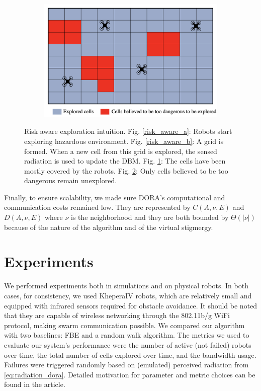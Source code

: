 \begin{figure}[htbp]
\begin{subfigure}{0.45\textwidth}
         \caption{}
         \label{risk_aware_c}
    \end{subfigure}
    \begin{subfigure}{0.45\textwidth}
         \centering
         \includegraphics[width=\textwidth]{figures/dora_explorer/risk_aware_d.png}
         \caption{}
         \label{risk_aware_d}
    \end{subfigure}
        \caption[Risk-aware exploration intuition]{Risk aware exploration intuition. Fig. \ref{risk_aware_a}: Robots start exploring hazardous environment. Fig. \ref{risk_aware_b}: A grid is formed. When a new cell from this grid is explored, the sensed radiation is used to update the \ac{DBM}. Fig. \ref{risk_aware_c}: The cells have been mostly covered by the robots. Fig. \ref{risk_aware_d}: Only cells believed to be too dangerous remain unexplored.}
    \label{risk_aware}
\end{figure}

Finally, to ensure scalability, we made sure \ac{DORA}'s computational and communication costs remained low. They are represented by $C(A, \nu, E)$ and $D(A, \nu, E)$ where $\nu$ is the neighborhood and they are both bounded by $\Theta(|\nu|)$ because of the nature of the algorithm and of the virtual stigmergy.

\section{Experiments}
We performed experiments both in simulations and on physical robots. In both cases, for consistency, we used KheperaIV \cite{kteam2021kheperaiv} robots, which are relatively small and equipped with infrared sensors required for obstacle avoidance. It should be noted that they are capable of wireless networking through the 802.11b/g WiFi protocol, making swarm communication possible. We compared our algorithm with two baselines: \ac{FBE} and a random walk algorithm. The metrics we used to evaluate our system's performance were the number of active (not failed) robots over time, the total number of cells explored over time, and the bandwidth usage. Failures were triggered randomly based on (emulated) perceived radiation from \eqref{eq:radiation_dora}. Detailed motivation for parameter and metric choices can be found in the article.

